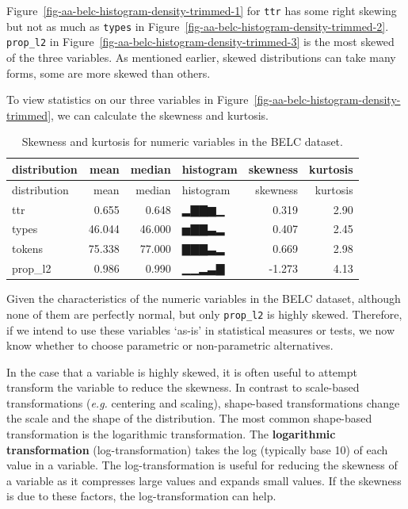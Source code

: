 \documentclass[
  letterpaper,
  DIV=11,
  numbers=noendperiod]{scrreport}
\theoremstyle{definition}
\theoremstyle{remark}
\begin{document}
Figure~\ref{fig-aa-belc-histogram-density-trimmed-1} for \texttt{ttr}
has some right skewing but not as much as \texttt{types} in
Figure~\ref{fig-aa-belc-histogram-density-trimmed-2}. \texttt{prop\_l2}
in Figure~\ref{fig-aa-belc-histogram-density-trimmed-3} is the most
skewed of the three variables. As mentioned earlier, skewed
distributions can take many forms, some are more skewed than others.

To view statistics on our three variables in
Figure~\ref{fig-aa-belc-histogram-density-trimmed}, we can calculate the
skewness and kurtosis.

\hypertarget{tbl-aa-belc-skewness-kurtosis}{}
\begin{longtable}[]{@{}lrrlrr@{}}
\caption{\label{tbl-aa-belc-skewness-kurtosis}Skewness and kurtosis for
numeric variables in the BELC dataset.}\tabularnewline
\toprule\noalign{}
distribution & mean & median & histogram & skewness & kurtosis \\
\midrule\noalign{}
\endfirsthead
\toprule\noalign{}
distribution & mean & median & histogram & skewness & kurtosis \\
\midrule\noalign{}
\endhead
\bottomrule\noalign{}
\endlastfoot
ttr & 0.655 & 0.648 & ▂▇▇▆▁ & 0.319 & 2.90 \\
types & 46.044 & 46.000 & ▅▇▇▃▂ & 0.407 & 2.45 \\
tokens & 75.338 & 77.000 & ▇▇▇▃▂ & 0.669 & 2.98 \\
prop\_l2 & 0.986 & 0.990 & ▁▁▂▃▇ & -1.273 & 4.13 \\
\end{longtable}

Given the characteristics of the numeric variables in the BELC dataset,
although none of them are perfectly normal, but only \texttt{prop\_l2}
is highly skewed. Therefore, if we intend to use these variables `as-is'
in statistical measures or tests, we now know whether to choose
parametric or non-parametric alternatives.

In the case that a variable is highly skewed, it is often useful to
attempt transform the variable to reduce the skewness. In contrast to
scale-based transformations (\emph{e.g.} centering and scaling),
shape-based transformations change the scale and the shape of the
distribution. The most common shape-based transformation is the
logarithmic transformation. The \textbf{logarithmic transformation}
(log-transformation) takes the log (typically base 10) of each value in
a variable. The log-transformation is useful for reducing the skewness
of a variable as it compresses large values and expands small values. If
the skewness is due to these factors, the log-transformation can help.
\end{document}
